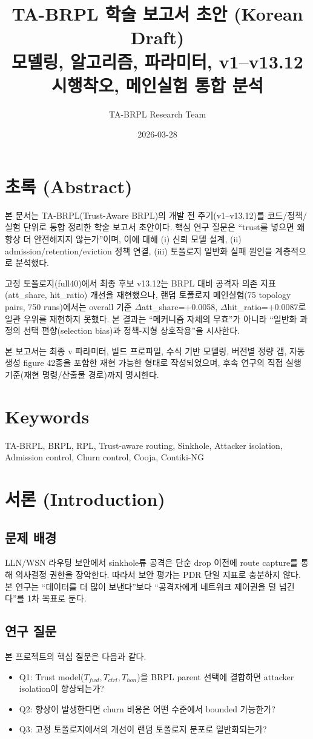 \documentclass[11pt,a4paper]{report}
\title{\textbf{TA-BRPL 학술 보고서 초안 (Korean Draft)}\\
\large 모델링, 알고리즘, 파라미터, v1--v13.12 시행착오, 메인실험 통합 분석}
\author{TA-BRPL Research Team}
\date{2026-03-28}
\begin{document}
\maketitle
\tableofcontents
\listoffigures
\listoftables

\chapter*{초록 (Abstract)}
본 문서는 TA-BRPL(Trust-Aware BRPL)의 개발 전 주기(v1--v13.12)를 코드/정책/실험 단위로 통합 정리한 학술 보고서 초안이다.
핵심 연구 질문은 ``trust를 넣으면 왜 항상 더 안전해지지 않는가''이며, 이에 대해 (i) 신뢰 모델 설계, (ii) admission/retention/eviction 정책 연결, (iii) 토폴로지 일반화 실패 원인을 계층적으로 분석했다.

고정 토폴로지(full40)에서 최종 후보 v13.12는 BRPL 대비 공격자 의존 지표(att\_share, hit\_ratio) 개선을 재현했으나, 랜덤 토폴로지 메인실험(75 topology pairs, 750 runs)에서는 overall 기준 $\Delta$att\_share=+0.0058, $\Delta$hit\_ratio=+0.0087로 일관 우위를 재현하지 못했다.
본 결과는 ``메커니즘 자체의 무효''가 아니라 ``일반화 과정의 선택 편향(selection bias)과 정책-지형 상호작용''을 시사한다.

본 보고서는 최종 v 파라미터, 빌드 프로파일, 수식 기반 모델링, 버전별 정량 갭, 자동 생성 figure 42종을 포함한 재현 가능한 형태로 작성되었으며, 후속 연구의 직접 실행 기준(재현 명령/산출물 경로)까지 명시한다.

\chapter*{Keywords}
TA-BRPL, BRPL, RPL, Trust-aware routing, Sinkhole, Attacker isolation, Admission control, Churn control, Cooja, Contiki-NG

\chapter{서론 (Introduction)}
\section{문제 배경}
LLN/WSN 라우팅 보안에서 sinkhole류 공격은 단순 drop 이전에 route capture를 통해 의사결정 권한을 장악한다.
따라서 보안 평가는 PDR 단일 지표로 충분하지 않다.
본 연구는 ``데이터를 더 많이 보낸다''보다 ``공격자에게 네트워크 제어권을 덜 넘긴다''를 1차 목표로 둔다.

\section{연구 질문}
본 프로젝트의 핵심 질문은 다음과 같다.
\begin{itemize}
  \item Q1: Trust model($T_{fwd}, T_{ctrl}, T_{hon}$)을 BRPL parent 선택에 결합하면 attacker isolation이 향상되는가?
  \item Q2: 향상이 발생한다면 churn 비용은 어떤 수준에서 bounded 가능한가?
  \item Q3: 고정 토폴로지에서의 개선이 랜덤 토폴로지 분포로 일반화되는가?
\end{itemize}
\end{document}
